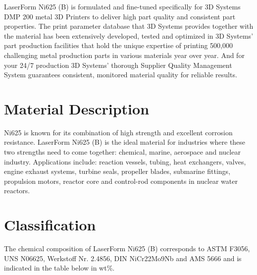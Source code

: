 \documentclass[10pt]{article}
\begin{document}
LaserForm Ni625 (B) is formulated and fine-tuned specifically for 3D Systems DMP 200 metal 3D Printers to deliver high part quality and consistent part properties. The print parameter database that 3D Systems provides together with the material has been extensively developed, tested and optimized in 3D Systems' part production facilities that hold the unique expertise of printing 500,000 challenging metal production parts in various materials year over year. And for your 24/7 production 3D Systems' thorough Supplier Quality Management System guarantees consistent, monitored material quality for reliable results.

\section*{Material Description}
Ni625 is known for its combination of high strength and excellent corrosion resistance. LaserForm Ni625 (B) is the ideal material for industries where these two strengths need to come together: chemical, marine, aerospace and nuclear industry. Applications include: reaction vessels, tubing, heat exchangers, valves, engine exhaust systems, turbine seals, propeller blades, submarine fittings, propulsion motors, reactor core and control-rod components in nuclear water reactors.

\section*{Classification}
The chemical composition of LaserForm Ni625 (B) corresponds to ASTM F3056, UNS N06625, Werkstoff Nr. 2.4856, DIN NiCr22Mo9Nb and AMS 5666 and is indicated in the table below in wt\%.
\end{document}
